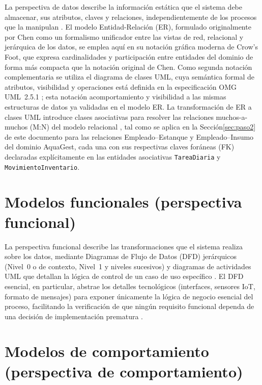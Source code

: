 \documentclass[11pt,a4paper]{report}
\begin{document}
La perspectiva de datos describe la información estática que el sistema debe almacenar, sus atributos, claves y relaciones, independientemente de los procesos que la manipulan \cite{maciaszek2007}. El modelo Entidad-Relación (ER), formulado originalmente por Chen \cite{chen1976er} como un formalismo unificador entre las vistas de red, relacional y jerárquica de los datos, se emplea aquí en su notación gr\'afica moderna de Crow's Foot, que expresa cardinalidades y participación entre entidades del dominio de forma más compacta que la notación original de Chen. Como segunda notación complementaria se utiliza el diagrama de clases UML, cuya semántica formal de atributos, visibilidad y operaciones est\'a definida en la especificación OMG UML~2.5.1 \cite{omg2017uml}; esta notación a\nade comportamiento y visibilidad a las mismas estructuras de datos ya validadas en el modelo ER. La transformación de ER a clases UML introduce clases asociativas para resolver las relaciones muchos-a-muchos (M:N) del modelo relacional \cite{maciaszek2007}, tal como se aplica en la Sección\ref{sec:paso2} de este documento para las relaciones Empleado--Estanque y Empleado--Insumo del dominio AquaGest, cada una con sus respectivas claves foráneas (FK) declaradas explícitamente en las entidades asociativas \texttt{TareaDiaria} y \texttt{MovimientoInventario}.

\section{Modelos funcionales (perspectiva funcional)}

La perspectiva funcional describe las transformaciones que el sistema realiza sobre los datos, mediante Diagramas de Flujo de Datos (DFD) jerárquicos (Nivel~0 o de contexto, Nivel~1 y niveles sucesivos) y diagramas de actividades UML \cite{omg2017uml} que detallan la lógica de control de un caso de uso específico \cite{maciaszek2007,pohl2025}. El DFD esencial, en particular, abstrae los detalles tecnológicos (interfaces, sensores IoT, formato de mensajes) para exponer \'unicamente la lógica de negocio esencial del proceso, facilitando la verificación de que ningún requisito funcional dependa de una decisión de implementación prematura \cite{iso29148}.

\section{Modelos de comportamiento (perspectiva de comportamiento)}
\end{document}

